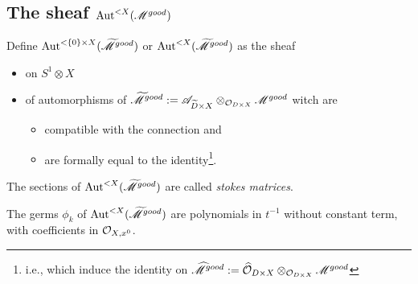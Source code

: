 \subsection{The sheaf $\operatorname{Aut}^{<X}(\mathscr{M}^{good})$}
\begin{defn}
  Define $\operatorname{Aut}^{<\{0\}\times X}(\widetilde{\mathscr{M}}^{good})$ or
  $\operatorname{Aut}^{<X}(\widetilde{\mathscr{M}}^{good})$ as the sheaf
  \begin{itemize}
    \item on $S^1\otimes X$
    \item of automorphisms of $\widetilde{\mathscr{M}}^{good}:=\mathscr{A}_{\widetilde D\times
      X}\otimes_{\mathcal{O}_{D\times X}}\mathscr{M}^{good}$
      witch are
      \begin{itemize}
        \item compatible with the connection and
        \item are formally equal to the identity\footnote{i.e., which
          induce the identity on $\widehat {\mathscr{M}}^{good}:=\widehat {\mathcal{O}}_{D\times
          X}\otimes_{\mathcal{O}_{D\times X}}\mathscr{M}^{good}$}.
      \end{itemize}
  \end{itemize}
  The sections of $\operatorname{Aut}^{<X}(\widetilde{\mathscr{M}}^{good})$ are called \emph{stokes
  matrices}.
\end{defn}
The germs $\phi_k$ of $\operatorname{Aut}^{<X}(\widetilde{\mathscr{M}}^{good})$ are polynomials in $t^{-1}$
without constant term, with coefficients in $\mathcal{O}_{X,x^0}$.

